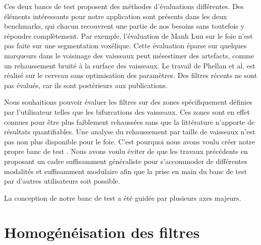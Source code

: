 Ces deux bancs de test proposent des méthodes d'évaluations différentes. Des éléments intéressants pour notre application sont présents dans les deux benchmarks, qui chacun recouvrent une partie de nos besoins sans toutefois y répondre complètement. Par exemple, l'évaluation de Manh Luu sur le foie n'est pas faite sur une segmentation voxélique. Cette évaluation éparse sur quelques marqueurs dans le voisinage des vaisseaux peut mésestimer des artefacts, comme un rehaussement bruité à la surface des vaisseaux. Le travail de Phellan et al. est réalisé sur le cerveau sans optimisation des paramètres. Des filtres récents ne sont pas évalués, car ils sont postérieurs aux publications. 

Nous souhaitions pouvoir évaluer les filtres sur des zones spécifiquement définies par l'utilisateur telles que les bifurcations des vaisseaux. Ces zones sont en effet connues pour être plus faiblement rehaussées sans que la littérature n'apporte de résultats quantifiables. Une analyse du rehaussement par taille de vaisseaux n'est pas non plus disponible pour le foie. C'est pourquoi nous avons voulu créer notre propre banc de test . Nous avons voulu éviter de  que les travaux précédents en proposant un cadre suffisamment généraliste pour s'accommoder de différentes modalités et suffisamment modulaire afin que la prise en main du banc de test par d'autres utilisateurs soit possible.

La conception de notre banc de test a été guidée par plusieurs axes majeurs.
  

\section{Homogénéisation des filtres}
\label{sec:Filtres}

